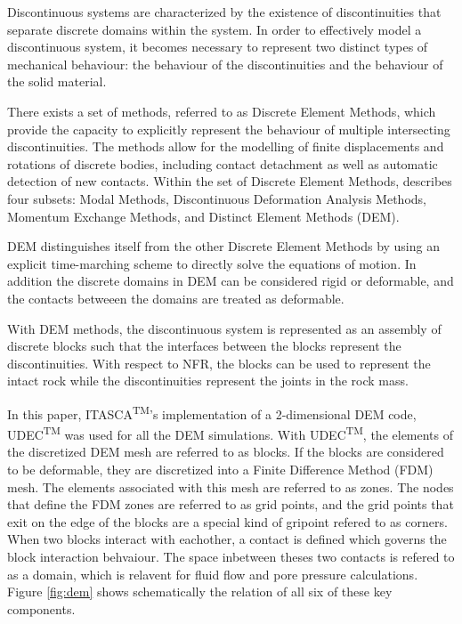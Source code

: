 Discontinuous systems are characterized by the existence of discontinuities that separate discrete domains within the system. In order to effectively model a discontinuous system, it becomes necessary to represent two distinct types of mechanical behaviour: the behaviour of the discontinuities and the behaviour of the solid material.

There exists a set of methods, referred to as Discrete Element Methods, which provide the capacity to explicitly represent the behaviour of multiple intersecting discontinuities. The methods allow for the modelling of finite displacements and rotations of discrete bodies, including contact detachment as well as automatic detection of new contacts. Within the set of Discrete Element Methods, \citet{CUNDALL_1992} describes four subsets: Modal Methods, Discontinuous Deformation Analysis Methods, Momentum Exchange Methods, and Distinct Element Methods (DEM).

DEM distinguishes itself from the other Discrete Element Methods by using an explicit time-marching scheme to directly solve the equations of motion. In addition the discrete domains in DEM can be considered rigid or deformable, and the contacts betweeen the domains are treated as deformable.  


With DEM methods, the discontinuous system is represented as an assembly of discrete blocks such that the interfaces between the blocks represent the discontinuities. With respect to NFR, the blocks can be used to represent the intact rock while the discontinuities represent the joints in the rock mass.  

In this paper, ITASCA\textsuperscript{TM}'s implementation of a 2-dimensional DEM code, UDEC\textsuperscript{TM} was used for all the DEM simulations. With UDEC\textsuperscript{TM}, the elements of the discretized DEM mesh are referred to as blocks. If the blocks are considered to be deformable, they are discretized into a Finite Difference Method (FDM) mesh. The elements associated with this mesh are referred to as zones. The nodes that define the FDM zones are referred to as grid points, and the grid points that exit on the edge of the blocks are a special kind of gripoint refered to as corners. When two blocks interact with eachother, a contact is defined which governs the block interaction behvaiour. The space inbetween theses two contacts is refered to as a domain, which is relavent for fluid flow and pore pressure calculations. Figure \ref{fig:dem} shows schematically the relation of all six of these key components. 